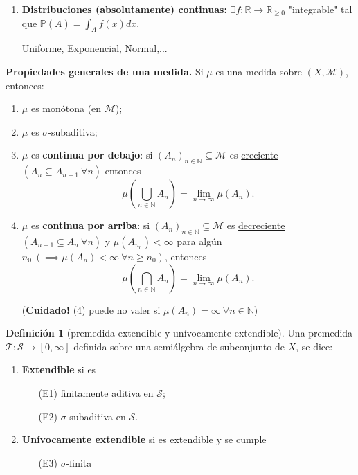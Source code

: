 \documentclass[11pt]{article}
\theoremstyle{definition} %
\newtheorem{definition}[theorem]{Definición}
\newcommand{\R}{\mathbb{R}}
\newcommand{\N}{\mathbb{N}}
\begin{document}
\begin{property}
\begin{enumerate}
	\item \textbf{Distribuciones (absolutamente) continuas:} $\exists f : \R \to \R_{\geq 0}$ "integrable" tal que $\mathbb{P}(A) = \int_{A} f(x) dx$.
	\begin{eg}
		Uniforme, Exponencial, Normal,...
	\end{eg}
\end{enumerate}

\noindent \textbf{Propiedades generales de una medida.} Si $\mu$ es una medida sobre $(X,\mathscr{M})$, entonces:
\begin{enumerate}
	\item $\mu$ es monótona (en $\mathscr{M}$);

	\item $\mu$ es $\sigma$-subaditiva;

	\item $\mu$ es \textbf{continua por debajo}: si $(A_n)_{n\in\N} \subseteq \mathscr{M}$ es \underline{creciente} $(A_n \subseteq A_{n+1}\ \forall n)$ entonces
	\[ \mu \left( \bigcup_{n\in\N} A_n \right) = \lim_{n \to \infty} \mu(A_n). \]

	\item $\mu$ es \textbf{continua por arriba}: si $(A_n)_{n\in\N} \subseteq \mathscr{M}$ es \underline{decreciente} $(A_{n+1} \subseteq A_n\ \forall n)$ y $\mu(A_{n_0})<\infty$ para algún $n_0\ (\implies \mu(A_n)<\infty\ \forall n\geq n_0)$, entonces
	\[ \mu \left( \bigcap_{n\in\N}A_n \right) = \lim_{n \to \infty} \mu(A_n). \]

	\noindent (\textbf{Cuidado!} (4) puede no valer si $\mu (A_n) = \infty \ \forall n \in \N$)
\end{enumerate}

\begin{definition}[premedida extendible y unívocamente extendible]
	Una premedida $\mathcal{T} : \mathscr{S} \to [0,\infty]$ definida sobre una semiálgebra de subconjunto de $X$, se dice:
	\begin{enumerate}
		\item \textbf{Extendible} si es
		\begin{enumerate}
			\item[(E1)] finitamente aditiva en $\mathscr{S}$;

			\item[(E2)] $\sigma$-subaditiva en $\mathscr{S}$.
		\end{enumerate}

		\item \textbf{Unívocamente extendible} si es extendible y se cumple
		\begin{enumerate}
			\item[(E3)] $\sigma$-finita
		\end{enumerate}
	\end{enumerate}
\end{definition}


\end{property}
\end{document}
